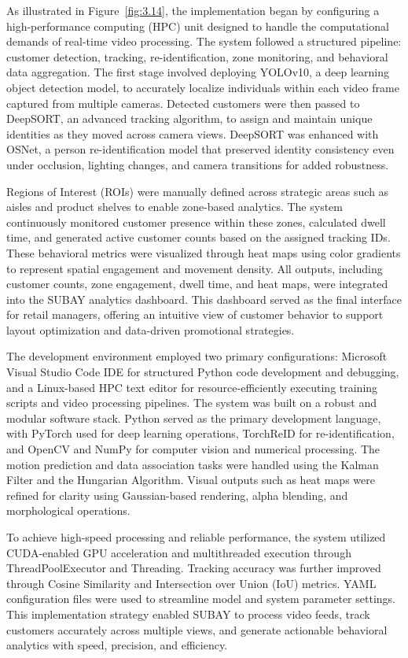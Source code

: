 {As illustrated in Figure~\ref{fig:3.14}, the implementation began by configuring a high-performance computing (HPC) unit designed to handle the computational demands of real-time video processing. The system followed a structured pipeline: customer detection, tracking, re-identification, zone monitoring, and behavioral data aggregation. The first stage involved deploying YOLOv10, a deep learning object detection model, to accurately localize individuals within each video frame captured from multiple cameras. Detected customers were then passed to DeepSORT, an advanced tracking algorithm, to assign and maintain unique identities as they moved across camera views. DeepSORT was enhanced with OSNet, a person re-identification model that preserved identity consistency even under occlusion, lighting changes, and camera transitions for added robustness.

Regions of Interest (ROIs) were manually defined across strategic areas such as aisles and product shelves to enable zone-based analytics. The system continuously monitored customer presence within these zones, calculated dwell time, and generated active customer counts based on the assigned tracking IDs. These behavioral metrics were visualized through heat maps using color gradients to represent spatial engagement and movement density. All outputs, including customer counts, zone engagement, dwell time, and heat maps, were integrated into the SUBAY analytics dashboard. This dashboard served as the final interface for retail managers, offering an intuitive view of customer behavior to support layout optimization and data-driven promotional strategies.

The development environment employed two primary configurations: Microsoft Visual Studio Code IDE for structured Python code development and debugging, and a Linux-based HPC text editor for resource-efficiently executing training scripts and video processing pipelines. The system was built on a robust and modular software stack. Python served as the primary development language, with PyTorch used for deep learning operations, TorchReID for re-identification, and OpenCV and NumPy for computer vision and numerical processing. The motion prediction and data association tasks were handled using the Kalman Filter and the Hungarian Algorithm. Visual outputs such as heat maps were refined for clarity using Gaussian-based rendering, alpha blending, and morphological operations.

To achieve high-speed processing and reliable performance, the system utilized CUDA-enabled GPU acceleration and multithreaded execution through ThreadPoolExecutor and Threading. Tracking accuracy was further improved through Cosine Similarity and Intersection over Union (IoU) metrics. YAML configuration files were used to streamline model and system parameter settings. This implementation strategy enabled SUBAY to process video feeds, track customers accurately across multiple views, and generate actionable behavioral analytics with speed, precision, and efficiency.

}

